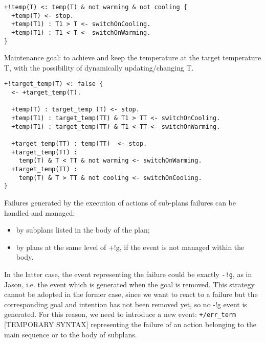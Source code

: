 {\small
\begin{verbatim}
+!temp(T) <: temp(T) & not warming & not cooling {
  +temp(T) <- stop.		
  +temp(T1) : T1 > T <- switchOnCooling.
  +temp(T1) : T1 < T <- switchOnWarming.
}
\end{verbatim}
}



\noindent Maintenance goal: to achieve and keep the temperature at the target temperature T, with the possibility of dynamically updating/changing T.

{\small
\begin{verbatim}
+!target_temp(T) <: false {
  <- +target_temp(T).	
 
  +temp(T) : target_temp (T) <- stop.		
  +temp(T1) : target_temp(TT) & T1 > TT <- switchOnCooling.	  
  +temp(T1) : target_temp(TT) & T1 < TT <- switchOnWarming.
 
  +target_temp(TT) : temp(TT)  <- stop.	
  +target_temp(TT) : 
    temp(T) & T < TT & not warming <- switchOnWarming.
  +target_temp(TT) : 
    temp(T) & T > TT & not cooling <- switchOnCooling.
}
\end{verbatim}}


  Failures generated by the execution of actions of sub-plans failures
  can be handled and managed:

\begin{itemize}
\item by subplans listed in the body of the plan;
\item by plans at the same level of +!g, if the event is not managed
  within the body.
\end{itemize}

\noindent In the latter case, the event representing the failure could
be exactly \texttt{-!g}, as in Jason, i.e. the event which is
generated when the goal is removed.
%
This strategy cannot be adopted in the former case, since we want to
react to a failure but the corresponding goal and intention has not
been removed yet, so no -!g event is generated. For this reason, we
need to introduce a new event: \texttt{+/err\_term} [TEMPORARY SYNTAX]
representing the failure of an action belonging to the main sequence
or to the body of subplans.

